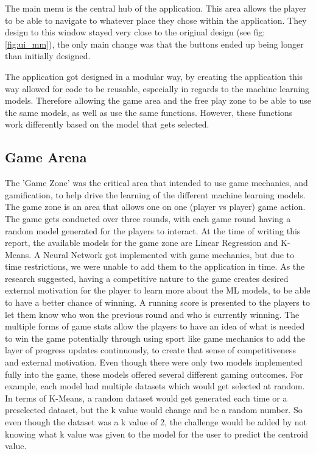 	The main menu is the central hub of the application. This area allows the player to be able to navigate to whatever place they chose within the application. They design to this window stayed very close to the original design (see fig: \ref{fig:ui_mm}), the only main change was that the buttons ended up being longer than initially designed.
	
	The application got designed in a modular way, by creating the application this way allowed for code to be reusable, especially in regards to the machine learning models. Therefore allowing the game area and the free play zone to be able to use the same models, as well as use the same functions. However, these functions work differently based on the model that gets selected. 
	
		
	\subsection{Game Arena}
	
		The 'Game Zone' was the critical area that intended to use game mechanics, and gamification, to help drive the learning of the different machine learning models. The game zone is an area that allows one on one (player vs player) game action. The game gets conducted over three rounds, with each game round having a random model generated for the players to interact. At the time of writing this report, the available models for the game zone are Linear Regression and K-Means. A Neural Network got implemented with game mechanics, but due to time restrictions, we were unable to add them to the application in time. As the research suggested, having a competitive nature to the game creates desired external motivation for the player to learn more about the ML models, to be able to have a better chance of winning. A running score is presented to the players to let them know who won the previous round and who is currently winning. The multiple forms of game stats allow the players to have an idea of what is needed to win the game potentially through using sport like game mechanics to add the layer of progress updates continuously, to create that sense of competitiveness and external motivation. Even though there were only two models implemented fully into the game, these models offered several different gaming outcomes. For example, each model had multiple datasets which would get selected at random. In terms of K-Means, a random dataset would get generated each time or a preselected dataset, but the k value would change and be a random number. So even though the dataset was a k value of 2, the challenge would be added by not knowing what k value was given to the model for the user to predict the centroid value. 
		
